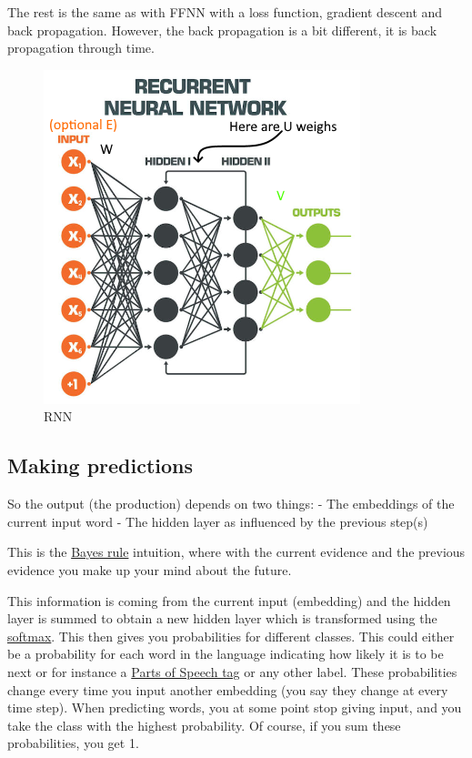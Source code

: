 \documentclass[
  11pt,
  british,
]{article}
\begin{document}
The rest is the same as with FFNN with a loss function, gradient descent
and back propagation. However, the back propagation is a bit different,
it is back propagation through time.

\begin{figure}
\centering
\includegraphics{RNN.png}
\caption{RNN}
\end{figure}

\hypertarget{making-predictions}{%
\subsection{Making predictions}\label{making-predictions}}

So the output (the production) depends on two things: - The embeddings
of the current input word - The hidden layer as influenced by the
previous step(s)

This is the
\href{Classification/Native\%20baiyes/Bayes\%20rule.md}{Bayes rule}
intuition, where with the current evidence and the previous evidence you
make up your mind about the future.

This information is coming from the current input (embedding) and the
hidden layer is summed to obtain a new hidden layer which is transformed
using the
\href{Feed\%20forward\%20neural\%20networks\%20(FFNN).md}{softmax}. This
then gives you probabilities for different classes. This could either be
a probability for each word in the language indicating how likely it is
to be next or for instance a
\href{Languages/Parts\%20of\%20Speech.md}{Parts of Speech tag} or any
other label. These probabilities change every time you input another
embedding (you say they change at every time step). When predicting
words, you at some point stop giving input, and you take the class with
the highest probability. Of course, if you sum these probabilities, you
get 1.
\end{document}
